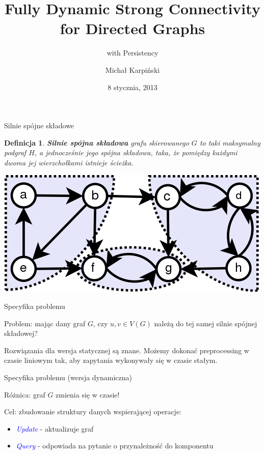 \documentclass{beamer}
\title{Fully Dynamic Strong Connectivity for Directed Graphs}
\subtitle{with Persistency}
\author{Michał Karpiński}
\date{8 stycznia, 2013}
\newtheorem{df}{Definicja}
\newcommand{\emp}[1]{\textcolor{blue}{\textit{#1}}}
\begin{document}
\begin{frame}[plain]
  \titlepage
\end{frame}

\begin{frame}{Silnie spójne składowe}

\begin{df}
{\bf Silnie spójna składowa} grafu skierowanego $G$ to taki maksymalny podgraf $H$, a jednocześnie jego spójna składowa, taka, że pomiędzy każdymi dwoma jej wierzchołkami istnieje ścieżka.
\end{df}

\begin{center}
\includegraphics[scale=0.5]{img/Scc.png}
\end{center}

\end{frame}

\begin{frame}{Specyfika problemu}

Problem: mając dany graf $G$, czy $u,v \in V(G)$ należą do tej samej silnie spójnej składowej?

\vspace{0.5cm}

Rozwiązania dla wersja statycznej są znane. Możemy dokonać preprocessing w czasie liniowym tak, aby zapytania wykonywały się w czasie stałym.

\end{frame}

\begin{frame}{Specyfika problemu (wersja dynamiczna)}

Różnica: graf $G$ zmienia się w czasie!

\vspace{0.5cm}

Cel: zbudowanie struktury danych wspierającej operacje:
\begin{itemize}
\item \emp{Update} - aktualizuje graf
\item \emp{Query} - odpowiada na pytanie o przynależność do komponentu
\end{itemize}
\end{frame}
\end{document}
